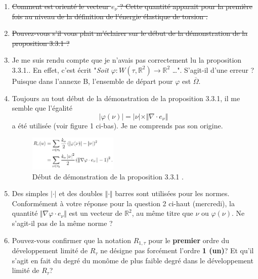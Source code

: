 \documentclass[
  french,
	11pt, %
]{fphw}
\begin{document}
\begin{enumerate}
  \item \sout{Comment est orienté le vecteur $e_\nu$ ? Cette quantité apparait pour la première fois au niveau de la définition de l'énergie élastique de torsion \parencite[p.91]{balasoiu2020halthesis}.} 
  \item \sout{Pouvez-vous s'il vous plait m'éclairer sur le début de la démonstration de la proposition 3.3.1 \parencite[p.93]{balasoiu2020halthesis} ?}
  \item Je me suis rendu compte que je n'avais pas correctement lu la proposition 3.3.1.. En effet, c'est écrit "\textit{Soit $\varphi : W(\tau, \mathbb{R}^2) \rightarrow \mathbb{R}^2$} \ldots ". S'agit-il d'une erreur ? Puisque dans l'annexe B, l'ensemble de départ pour $\varphi$ est $\overline{\Omega}$.
  \item Toujours au tout début de la démonstration de la proposition 3.3.1, il me semble que l'égalité $$\vert \varphi (\nu) \vert = \vert \nu \vert \times \Vert \nabla \cdot e_{\nu} \Vert$$ a été utilisée (voir figure 1 ci-bas). Je ne comprends pas son origine.
  \begin{figure}[H]
    \centering
    \includegraphics[width=0.4\textwidth]{Propo12.png}
    \caption{Début de démonstration de la proposition 3.3.1 \parencite[p.93]{balasoiu2020halthesis}.}
  \end{figure}
  \item Des simples $\vert \cdot \vert$ et des doubles $\Vert \cdot \Vert$ barres sont utilisées pour les normes. Conformément à votre réponse pour la question 2 ci-haut (mercredi), la quantité $\Vert \nabla \varphi \cdot e_{\nu} \Vert$ est un vecteur de $\mathbb{R}^2$, au même titre que $\nu$ ou $\varphi(\nu)$. Ne s'agit-il pas de la même norme ?
  \item Pouvez-vous confirmer que la notation $R_{1,\tau}$ pour le \textbf{premier} ordre du développement limité de $R_{\tau}$ ne désigne pas forcément l'ordre \textbf{1 (un)}? Et qu'il s'agit en fait du degré du monôme de plus faible degré dans le développement limité de $R_{\tau}$?

\end{enumerate}
\end{document}
